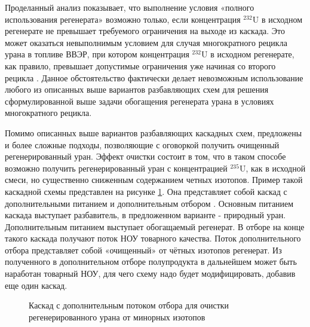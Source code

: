 Проделанный анализ показывает, что выполнение условия «полного использования регенерата» возможно только, если концентрация $^{232}$U в исходном регенерате не превышает требуемого ограничения на выходе из каскада. Это может оказаться невыполнимым условием для случая многократного рецикла урана в топливе ВВЭР, при котором концентрация $^{232}$U в исходном регенерате, как правило, превышает допустимые ограничения уже начиная со второго рецикла \cite{rodionovaAnalizTehnikoekonomicheskihHarakteristik2019,smirnovFizikotehnicheskieProblemyObogashcheniya2020}. Данное обстоятельство фактически делает невозможным использование любого из описанных выше вариантов разбавляющих схем для решения сформулированной выше задачи обогащения регенерата урана в условиях многократного рецикла.



Помимо описанных выше вариантов разбавляющих каскадных схем, предложены и более сложные подходы, позволяющие с оговоркой получить очищенный регенерированный уран. Эффект очистки состоит в том, что в таком способе возможно получить регенерированный уран с концентрацией $^{235}$U, как в исходной смеси, но существенно сниженным содержанием четных изотопов. Пример такой каскадной схемы представлен на рисунке \ref{fig:3_out}. Она представляет собой каскад с дополнительными питанием и дополнительным отбором \cite{palkinSeparationUraniumIsotopes2010}. Основным питанием каскада выступает разбавитель, в предложенном варианте - природный уран. Дополнительным питанием выступает обогащаемый регенерат. В отборе на конце такого каскада получают поток НОУ товарного качества. Поток дополнительного отбора представляет собой «очищенный» от чётных изотопов регенерат. Из полученного в дополнительном отборе полупродукта в дальнейшем может быть наработан товарный НОУ, для чего схему надо будет модифицировать, добавив еще один каскад.

\begin{figure}[ht]
  \caption{Каскад с дополнительным потоком отбора для очистки регенерированного урана от минорных изотопов}\label{fig:3_out}
\end{figure}


